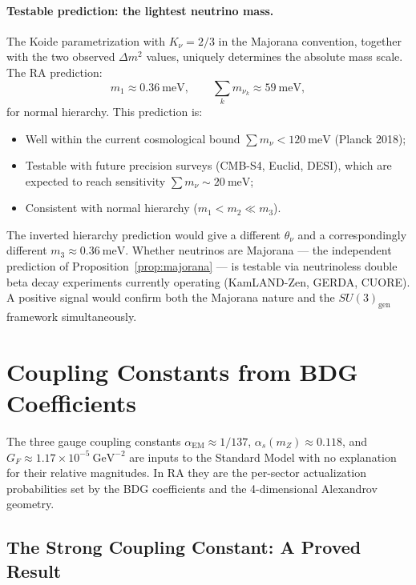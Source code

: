 \documentclass[11pt,a4paper]{article}
\begin{document}
\paragraph{Testable prediction: the lightest neutrino mass.}
The Koide parametrization with $K_\nu = 2/3$ in the Majorana convention,
together with the two observed $\Delta m^2$ values, uniquely determines
the absolute mass scale. The RA prediction:
\begin{equation}
  m_1 \approx 0.36~\text{meV}, \qquad
  \sum_k m_{\nu_k} \approx 59~\text{meV},
  \label{eq:neutrino_mass_pred}
\end{equation}
for normal hierarchy. This prediction is:
\begin{itemize}[noitemsep]
  \item Well within the current cosmological bound
  $\sum m_\nu < 120~\text{meV}$ (Planck 2018);
  \item Testable with future precision surveys (CMB-S4, Euclid,
  DESI), which are expected to reach sensitivity $\sum m_\nu \sim 20~\text{meV}$;
  \item Consistent with normal hierarchy ($m_1 < m_2 \ll m_3$).
\end{itemize}

The inverted hierarchy prediction would give a different $\theta_\nu$ and
a correspondingly different $m_3 \approx 0.36~\text{meV}$.
Whether neutrinos are Majorana --- the independent prediction of
Proposition~\ref{prop:majorana} --- is testable via neutrinoless double
beta decay experiments currently operating (KamLAND-Zen, GERDA, CUORE).
A positive signal would confirm both the Majorana nature and the
$SU(3)_{\mathrm{gen}}$ framework simultaneously.

\section{Coupling Constants from BDG Coefficients}
\label{sec:couplings}

The three gauge coupling constants $\alpha_{\mathrm{EM}} \approx 1/137$,
$\alpha_s(m_Z) \approx 0.118$, and $G_F \approx 1.17 \times
10^{-5}~\text{GeV}^{-2}$ are inputs to the Standard Model with no
explanation for their relative magnitudes.  In RA they are the per-sector
actualization probabilities set by the BDG coefficients and the
4-dimensional Alexandrov geometry.

\subsection{The Strong Coupling Constant: A Proved Result}
\label{sec:alpha_s_proof}
\end{document}
